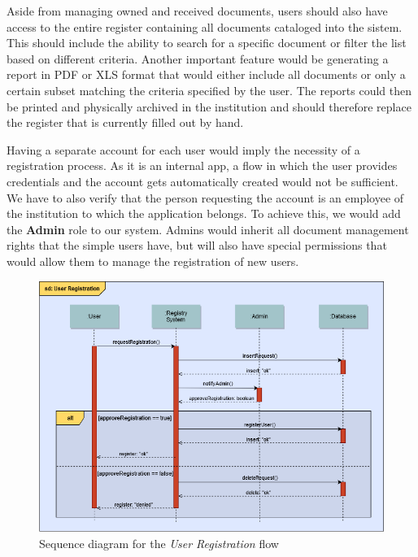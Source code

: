 Aside from managing owned and received documents, users should also have access to the entire register containing all documents cataloged into the sistem. This should include the ability to search for a specific document or filter the list based on different criteria. Another important feature would be generating a report in PDF or XLS format that would either include all documents or only a certain subset matching the criteria specified by the user. The reports could then be printed and physically archived in the institution and should therefore replace the register that is currently filled out by hand.

Having a separate account for each user would imply the necessity of a registration process. As it is an internal app, a flow in which the user provides credentials and the account gets automatically created would not be sufficient. We have to also verify that the person requesting the account is an employee of the institution to which the application belongs. To achieve this, we would add the \textbf{Admin} role to our system. Admins would inherit all document management rights that the simple users have, but will also have special permissions that would allow them to manage the registration of new users.

\begin{figure}[H]
    \centering
    \includegraphics[width=5in]{images/sequenceDiagram}
    \caption{Sequence diagram for the \textit{User Registration} flow}
    \label{sequenceDiagram}
\end{figure}

